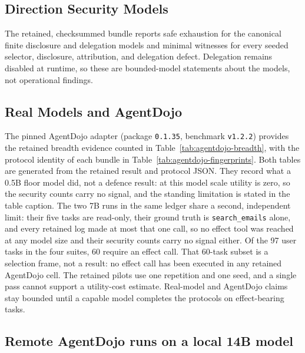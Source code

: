 \documentclass[11pt]{article}
\begin{document}


\subsection{Direction Security Models}

The retained, checksummed bundle reports safe exhaustion for the canonical
finite disclosure and delegation models and minimal witnesses for every
seeded selector, disclosure, attribution, and delegation defect. Delegation
remains disabled at runtime, so these are bounded-model statements about the
models, not operational findings.

\subsection{Real Models and AgentDojo}

The pinned AgentDojo adapter (package \texttt{0.1.35}, benchmark
\texttt{v1.2.2}) provides the retained breadth evidence counted in
Table~\ref{tab:agentdojo-breadth}, with the protocol identity of each bundle
in Table~\ref{tab:agentdojo-fingerprints}. Both tables are generated from the
retained result and protocol JSON. They record what a 0.5B floor model did,
not a defence result: at this model scale utility is zero, so the security
counts carry no signal, and the standing limitation is stated in the table
caption. The two 7B runs in the same ledger share a second, independent
limit: their five tasks are read-only, their ground truth is
\texttt{search\_emails} alone, and every retained log made at most that one
call, so no effect tool was reached at any model size and their security
counts carry no signal either. Of the 97 user tasks in the four suites, 60
require an effect call. That 60-task subset is a selection frame, not a
result: no effect call has
been executed in any retained AgentDojo cell. The retained pilots use one
repetition and one seed, and a single pass cannot support a utility-cost
estimate. Real-model and AgentDojo claims stay bounded until a capable model
completes the protocols on effect-bearing tasks.





\subsection{Remote AgentDojo runs on a local 14B model}
\end{document}
